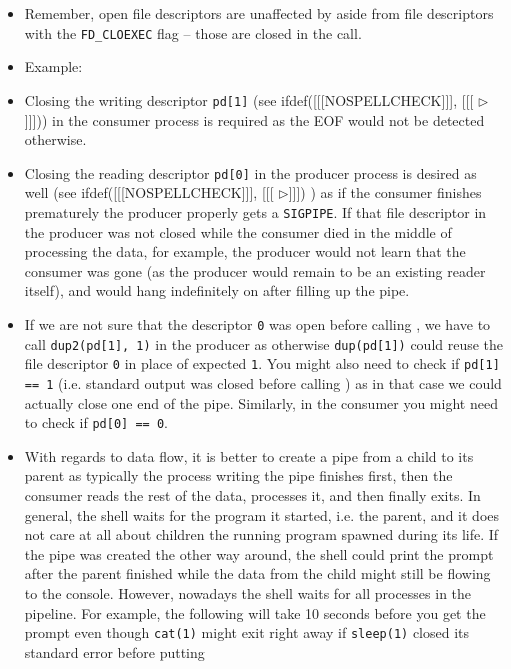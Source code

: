\begin{itemize}
\item Remember, open file descriptors are unaffected by  aside from
file descriptors with the \texttt{FD\_CLOEXEC} flag -- those are closed in the
  call.
\item Example: 
\item Closing the writing descriptor \texttt{pd[1]} (see
ifdef([[[NOSPELLCHECK]]], [[[{\color[rgb]{1,0,0} $\triangleright$}]]]))
in the consumer process is required as the EOF would not be detected otherwise.
\item Closing the reading descriptor \texttt{pd[0]} in the producer process is
desired as well (see
ifdef([[[NOSPELLCHECK]]], [[[{\color[rgb]{1,0,0} $\triangleright$}]]])
) as if the consumer finishes prematurely the producer properly gets a
\texttt{SIGPIPE}.
If that file descriptor in the producer was not closed while the consumer died
in the middle of processing the data, for example, the producer would not learn
that the consumer was gone (as the producer would remain to be an existing
reader itself), and would hang indefinitely on  after filling up
the pipe.
\item If we are not sure that the descriptor \texttt{0} was open before calling
, we have to call \texttt{dup2(pd[1], 1)} in the producer as
otherwise \texttt{dup(pd[1])} could reuse the file descriptor \texttt{0} in
place of expected \texttt{1}.  You might also need to check if \verb#pd[1] == 1#
(i.e. standard output was closed before calling ) as in that case we
could actually close one end of the pipe.  Similarly, in the consumer you might
need to check if \verb#pd[0] == 0#.
\item With regards to data flow, it is better to create a pipe from a child
to its parent as typically the
process writing the pipe finishes first, then the consumer reads the rest of the
data, processes it, and then finally exits.  In general, the shell waits for the
program it started, i.e. the parent, and it does not care at all about children
the running program spawned during its life.  If the pipe was created the other
way around, the shell could print the prompt after the parent finished while the
data from the child might still be flowing to the console.  However, nowadays
the shell waits for all processes in the pipeline.  For example, the following
will take 10 seconds before you get the prompt even though \texttt{cat(1)} might
exit right away if \texttt{sleep(1)} closed its standard error before putting

\end{itemize}
